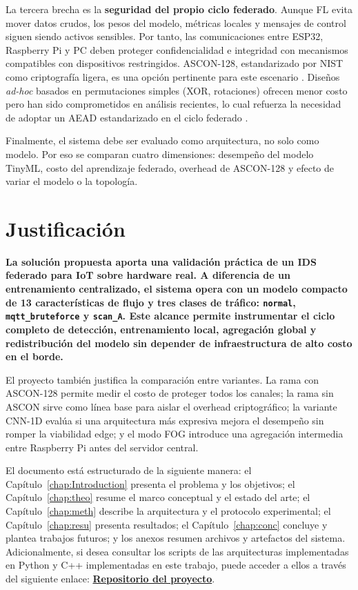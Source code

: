 La tercera brecha es la \textbf{seguridad del propio ciclo federado}. Aunque FL evita mover datos crudos, los pesos del modelo, métricas locales y mensajes de control siguen siendo activos sensibles. Por tanto, las comunicaciones entre ESP32, Raspberry Pi y PC deben proteger confidencialidad e integridad con mecanismos compatibles con dispositivos restringidos. ASCON-128, estandarizado por NIST como criptografía ligera, es una opción pertinente para este escenario \cite{NISTSP8002322025, Kaur2025_ASCON_Survey}. Diseños \emph{ad-hoc} basados en permutaciones simples (XOR, rotaciones) ofrecen menor costo pero han sido comprometidos en análisis recientes, lo cual refuerza la necesidad de adoptar un AEAD estandarizado en el ciclo federado \cite{Mirzaali2025_LWC_Permutations}.

Finalmente, el sistema debe ser evaluado como arquitectura, no solo como modelo. Por eso se comparan cuatro dimensiones: desempeño del modelo TinyML, costo del aprendizaje federado, overhead de ASCON-128 y efecto de variar el modelo o la topología.

\section{Justificación}

\textbf{La solución propuesta aporta una validación práctica de un IDS federado para IoT sobre hardware real. A diferencia de un entrenamiento centralizado, el sistema opera con un modelo compacto de 13 características de flujo y tres clases de tráfico: \texttt{normal}, \texttt{mqtt\_bruteforce} y \texttt{scan\_A}. Este alcance permite instrumentar el ciclo completo de detección, entrenamiento local, agregación global y redistribución del modelo sin depender de infraestructura de alto costo en el borde.}

El proyecto también justifica la comparación entre variantes. La rama con ASCON-128 permite medir el costo de proteger todos los canales; la rama sin ASCON sirve como línea base para aislar el overhead criptográfico; la variante CNN-1D evalúa si una arquitectura más expresiva mejora el desempeño sin romper la viabilidad edge; y el modo FOG introduce una agregación intermedia entre Raspberry Pi antes del servidor central.

El documento está estructurado de la siguiente manera: el Capítulo~\ref{chap:Introduction} presenta el problema y los objetivos; el Capítulo~\ref{chap:theo} resume el marco conceptual y el estado del arte; el Capítulo~\ref{chap:meth} describe la arquitectura y el protocolo experimental; el Capítulo~\ref{chap:resu} presenta resultados; el Capítulo~\ref{chap:conc} concluye y plantea trabajos futuros; y los anexos resumen archivos y artefactos del sistema. Adicionalmente, si desea consultar los scripts de las arquitecturas implementadas en Python y C++ implementadas en este trabajo, puede acceder a ellos a través del siguiente enlace: \href{https://github.com/sjaimes11/Tesis-Sistemas-HFD-2}{\textbf{Repositorio del proyecto}}.

